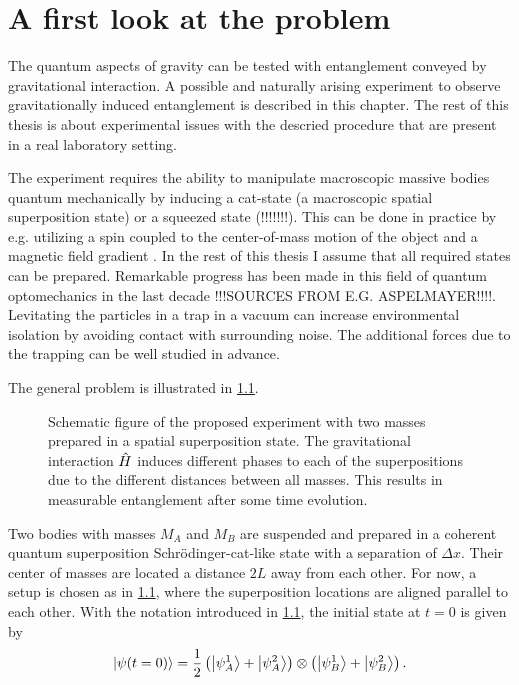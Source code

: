 \chapter{A first look at the problem}\label{cha:first-look}

The quantum aspects of gravity can be tested with entanglement conveyed by gravitational interaction. A possible and naturally arising experiment to observe gravitationally induced entanglement is described in this chapter.
The rest of this thesis is about experimental issues with the descried procedure that are present in a real laboratory setting.

The experiment requires the ability to manipulate macroscopic massive bodies quantum mechanically by inducing a cat-state (a macroscopic spatial superposition state) or a squeezed state (!!!!!!!). 
This can be done in practice by e.g. utilizing a spin coupled to the center-of-mass motion of the object and a magnetic field gradient \cite{Bose_2017}. In the rest of this thesis I assume that all required states can be prepared.
Remarkable progress has been made in this field of quantum optomechanics in the last decade !!!SOURCES FROM E.G. ASPELMAYER!!!!.
Levitating the particles in a trap in a vacuum can increase environmental isolation by avoiding contact with surrounding noise. The additional forces due to the trapping can be well studied in advance.

The general problem is illustrated in \cref{fig:2:simple-problem}.
\begin{figure}[!htbp]
  \centering
  \def\svgwidth{\textwidth}
  
  \caption{Schematic figure of the proposed experiment with two masses prepared in a spatial superposition state. The gravitational interaction $\hat{H}$ induces different phases to each of the superpositions due to the different distances between all masses. This results in measurable entanglement after some time evolution.}
  \label{fig:2:simple-problem}
\end{figure}
Two bodies with masses $M_A$ and $M_B$ are suspended and prepared in a coherent quantum superposition Schrödinger-cat-like state with a separation of $\Delta x$.
Their center of masses are located a distance $2L$ away from each other.
For now, a setup is chosen as in \cref{fig:2:simple-problem}, where the superposition locations are aligned parallel to each other.
With the notation introduced in \cref{fig:2:simple-problem}, the initial state at $t=0$ is given by
\begin{equation}\label{eq:2:initial-state}
  \ket{\psi(t=0)} = \frac{1}{2}\left( \ket{\psi_A^1} + \ket{\psi_A^2} \right) \otimes \left( \ket{\psi_B^1} + \ket{\psi_B^2} \right) .
\end{equation}


